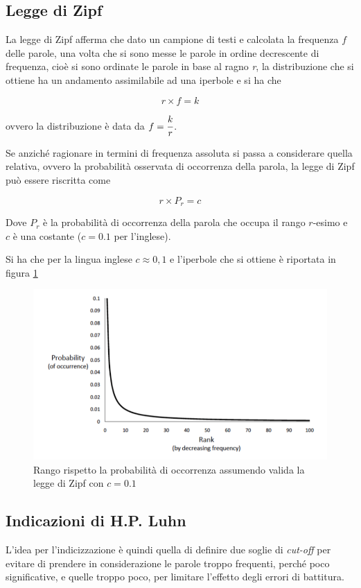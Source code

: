 \subsection{Legge di Zipf}

La legge di Zipf afferma che dato un campione di testi e calcolata la frequenza $f$ delle parole, una volta che si sono messe le parole in ordine decrescente di frequenza, cioè si sono ordinate le parole in base al ragno \textit{r}, la distribuzione che si ottiene ha un andamento assimilabile ad una iperbole e si ha che

$$
r \times f = k
$$

ovvero la distribuzione è data da $ f = \cfrac{k}{r}$.

Se anziché ragionare in termini di frequenza assoluta si passa a considerare quella relativa, ovvero la probabilità osservata di occorrenza della parola, la legge di Zipf può essere riscritta come 

$$
r \times P_r = c
$$

Dove $P_r$ è la probabilità di occorrenza della parola che occupa il rango $r$-esimo e $c$ è una costante ($c = 0.1$ per l'inglese).

Si ha che per la lingua inglese $c \approx 0,1$ e l'iperbole che si ottiene è riportata in figura \ref{fig:zipf}

\begin{figure}[htbp]
\centering
\includegraphics[width=0.55\linewidth]{images/l3-zipf}
\caption{Rango rispetto la probabilità di occorrenza assumendo valida la legge di Zipf con $c = 0.1$}\label{fig:zipf}
\end{figure}

\subsection{Indicazioni di H.P. Luhn}

L'idea per l'indicizzazione è quindi quella di definire due soglie di \textit{cut-off} per evitare di prendere in considerazione le parole troppo frequenti, perché poco significative, e quelle troppo poco, per limitare l'effetto degli errori di battitura.

